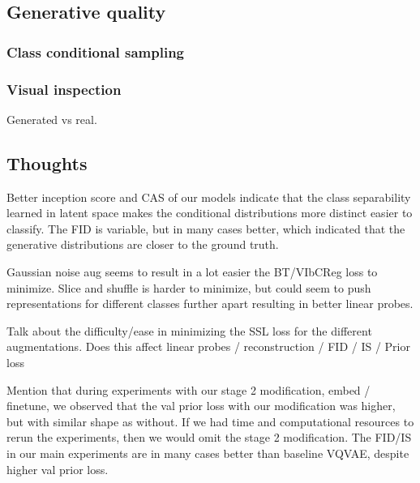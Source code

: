 \documentclass[../../thesis.tex]{subfiles}
\begin{document}
\subsection{Generative quality}



\subsubsection{Class conditional sampling}



\subsubsection{Visual inspection}

Generated vs real.



\subsection{Thoughts}

Better inception score and CAS of our models indicate that the class separability learned in latent space makes the conditional distributions more distinct easier to classify. The FID is variable, but in many cases better, which indicated that the generative distributions are closer to the ground truth.\newline

Gaussian noise aug seems to result in a lot easier the BT/VIbCReg loss to minimize. \newline
Slice and shuffle is harder to minimize, but could seem to push representations for different classes further apart resulting in better linear probes.\newline

Talk about the difficulty/ease in minimizing the SSL loss for the different augmentations. Does this affect linear probes / reconstruction / FID / IS / Prior loss
\newline

Mention that during experiments with our stage 2 modification, embed / finetune, we observed that the val prior loss with our modification was higher, but with similar shape as without. If we had time and computational resources to rerun the experiments, then we would omit the stage 2 modification. The FID/IS in our main experiments are in many cases better than baseline VQVAE, despite higher val prior loss.
\newline
\end{document}
